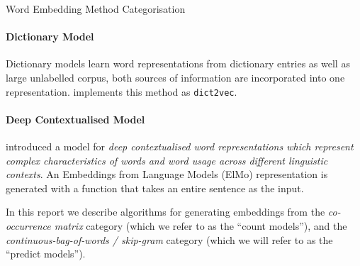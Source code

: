 \documentclass{ucetd}
\begin{document}
\begin{infobox}{Word Embedding Method Categorisation}
  \paragraph{Dictionary Model} Dictionary models learn word representations from dictionary entries as well as large unlabelled corpus, both sources of information are incorporated into one representation. \parencite{tissier-etal-2017-dict2vec} implements this method as \texttt{dict2vec}.
  \paragraph{Deep Contextualised Model} \parencite{peters18-deep-contex-word-repres} introduced a model for \emph{deep contextualised word representations which represent complex characteristics of words and word usage across different linguistic contexts}. An Embeddings from Language Models (ElMo) representation is generated with a function that takes an entire sentence as the input.
\end{infobox}
In this report we describe algorithms for generating embeddings from the \emph{co-occurrence matrix} category (which we refer to as the ``count models''), and the \emph{continuous-bag-of-words / skip-gram} category (which we will refer to as the ``predict models'').
\end{document}
